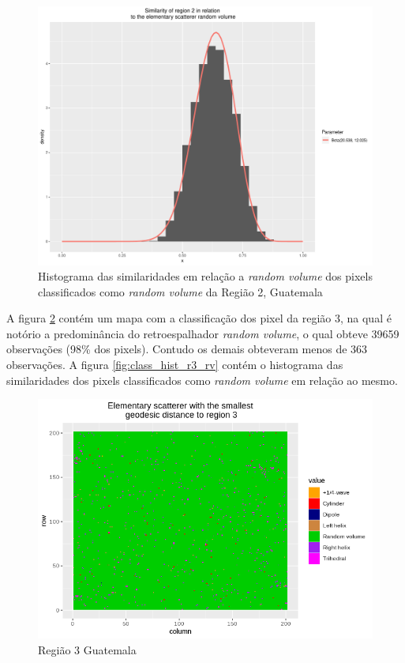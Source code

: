 \documentclass[12pt]{article}
\begin{document}
\begin{figure}[!h]
    \centering   
    \includegraphics[width = 0.85\linewidth]{../../Images/Report_18_12_20/Classifier_Geo_Dist/Histograms/Guate/region2_rv_sm_filter.pdf}
    \caption{Histograma das similaridades em relação a \textit{random volume} dos pixels classificados como \textit{random volume} da Região 2, Guatemala}
    \label{fig:class_hist_r2_rv}
\end{figure}

A figura \ref{fig:class_map_r3} contém um mapa com a classificação dos pixel da região 3, na qual é notório a predominância do retroespalhador \textit{random volume}, o qual obteve 39659 observações (98\% dos pixels). Contudo os demais obteveram menos de 363 observações. A figura \ref{fig:class_hist_r3_rv} contém o histograma das similaridades dos pixels classificados como \textit{random volume} em relação ao mesmo.

\begin{figure}[!h]
    \centering    
    \includegraphics[width = 0.8\linewidth]{../../Images/Report_18_12_20/Classifier_Geo_Dist/Class_Map/Guate/region3_predomain.png}
    \caption{Região 3 Guatemala}
    \label{fig:class_map_r3}
\end{figure}
\end{document}
